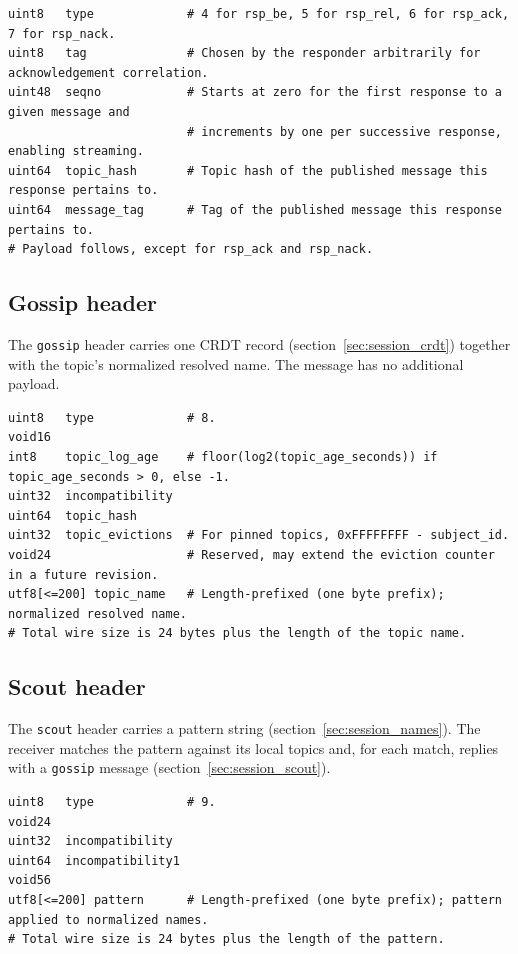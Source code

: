 \begin{verbatim}
uint8   type             # 4 for rsp_be, 5 for rsp_rel, 6 for rsp_ack, 7 for rsp_nack.
uint8   tag              # Chosen by the responder arbitrarily for acknowledgement correlation.
uint48  seqno            # Starts at zero for the first response to a given message and
                         # increments by one per successive response, enabling streaming.
uint64  topic_hash       # Topic hash of the published message this response pertains to.
uint64  message_tag      # Tag of the published message this response pertains to.
# Payload follows, except for rsp_ack and rsp_nack.
\end{verbatim}

\subsection{Gossip header}\label{sec:session_header_gossip}

The \texttt{gossip} header carries one CRDT record
(section~\ref{sec:session_crdt}) together with the topic's normalized
resolved name. The message has no additional payload.

\begin{verbatim}
uint8   type             # 8.
void16
int8    topic_log_age    # floor(log2(topic_age_seconds)) if topic_age_seconds > 0, else -1.
uint32  incompatibility
uint64  topic_hash
uint32  topic_evictions  # For pinned topics, 0xFFFFFFFF - subject_id.
void24                   # Reserved, may extend the eviction counter in a future revision.
utf8[<=200] topic_name   # Length-prefixed (one byte prefix); normalized resolved name.
# Total wire size is 24 bytes plus the length of the topic name.
\end{verbatim}

\subsection{Scout header}\label{sec:session_header_scout}

The \texttt{scout} header carries a pattern string
(section~\ref{sec:session_names}). The receiver matches the pattern against
its local topics and, for each match, replies with a \texttt{gossip} message
(section~\ref{sec:session_scout}).

\begin{verbatim}
uint8   type             # 9.
void24
uint32  incompatibility
uint64  incompatibility1
void56
utf8[<=200] pattern      # Length-prefixed (one byte prefix); pattern applied to normalized names.
# Total wire size is 24 bytes plus the length of the pattern.
\end{verbatim}

